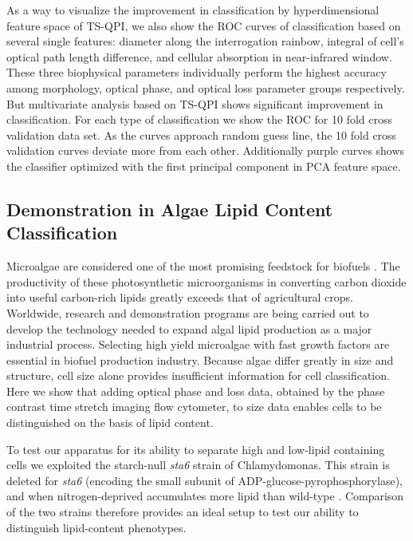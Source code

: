 \documentclass[aps,pra,reprint,longbibliography,superscriptaddress]{revtex4-1}
\begin{document}
As a way to visualize the improvement in classification by hyperdimensional feature space of TS-QPI, we also show the ROC curves of classification based on several single features: diameter along the interrogation rainbow, integral of cell's optical path length difference, and cellular absorption in near-infrared window. These three biophysical parameters individually perform the highest accuracy among morphology, optical phase, and optical loss parameter groups respectively. But multivariate analysis based on TS-QPI shows significant improvement in classification. For each type of classification we show the ROC for 10 fold cross validation data set. As the curves approach random guess line, the 10 fold cross validation curves deviate more from each other. Additionally purple curves shows the classifier optimized with the first principal component in PCA feature space.

\subsection{Demonstration in Algae Lipid Content Classification}

Microalgae are considered one of the most promising feedstock for biofuels \cite{merchant2012tag}. The productivity of these photosynthetic microorganisms in converting carbon dioxide into useful carbon-rich lipids greatly exceeds that of agricultural crops. Worldwide, research and demonstration programs are being carried out to develop the technology needed to expand algal lipid production as a major industrial process. Selecting high yield microalgae with fast growth factors are essential in biofuel production industry. Because algae differ greatly in size and structure, cell size alone provides insufficient information for cell classification. Here we show that adding optical phase and loss data, obtained by the phase contrast time stretch imaging flow cytometer, to size data enables cells to be distinguished on the basis of lipid content. 

To test our apparatus for its ability to separate high and low-lipid containing cells we exploited the starch-null \textit{sta6} strain of Chlamydomonas. This strain is deleted for \textit{sta6} \cite{zabawinski2001starchless} (encoding the small subunit of ADP-glucose-pyrophosphorylase), and when nitrogen-deprived accumulates more lipid than wild-type \cite{work2010increased, li2010chlamydomonas, goodenough2014path, blaby2013systems}. Comparison of the two strains therefore provides an ideal setup to test our ability to distinguish lipid-content phenotypes.
\end{document}
